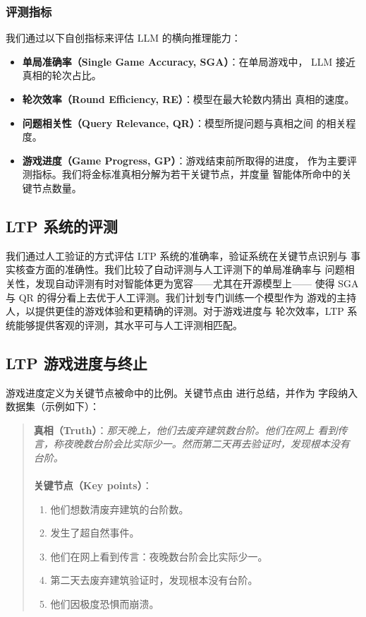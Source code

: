 \subsubsection*{评测指标}

我们通过以下自创指标来评估 LLM 的横向推理能力：
\begin{itemize}
    \item \textbf{单局准确率（Single Game Accuracy, SGA）}：在单局游戏中，
          LLM 接近真相的轮次占比。
    \item \textbf{轮次效率（Round Efficiency, RE）}：模型在最大轮数内猜出
          真相的速度。
    \item \textbf{问题相关性（Query Relevance, QR）}：模型所提问题与真相之间
          的相关程度。
    \item \textbf{游戏进度（Game Progress, GP）}：游戏结束前所取得的进度，
          作为主要评测指标。我们将金标准真相分解为若干关键节点，并度量
          智能体所命中的关键节点数量。
\end{itemize}

\subsection{LTP 系统的评测}

我们通过人工验证的方式评估 LTP 系统的准确率，验证系统在关键节点识别与
事实核查方面的准确性。我们比较了自动评测与人工评测下的单局准确率与
问题相关性，发现自动评测有时对智能体更为宽容——尤其在开源模型上——
使得 SGA 与 QR 的得分看上去优于人工评测。我们计划专门训练一个模型作为
游戏的主持人，以提供更佳的游戏体验和更精确的评测。对于游戏进度与
轮次效率，LTP 系统能够提供客观的评测，其水平可与人工评测相匹配。

\subsection{LTP 游戏进度与终止}

游戏进度定义为关键节点被命中的比例。关键节点由 
进行总结，并作为  字段纳入数据集（示例如下）：
\begin{quote}\small
\textbf{真相（Truth）}：\emph{那天晚上，他们去废弃建筑数台阶。他们在网上
看到传言，称夜晚数台阶会比实际少一。然而第二天再去验证时，发现根本没有
台阶。}\\
\\
\textbf{关键节点（Key points）}：
\begin{enumerate}
    \item 他们想数清废弃建筑的台阶数。
    \item 发生了超自然事件。
    \item 他们在网上看到传言：夜晚数台阶会比实际少一。
    \item 第二天去废弃建筑验证时，发现根本没有台阶。
    \item 他们因极度恐惧而崩溃。
\end{enumerate}
\end{quote}

